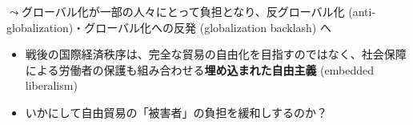 \documentclass[
  xelatex,
  ja=standard]{bxjsarticle}
\providecommand{\tightlist}{%
  \setlength{\itemsep}{0pt}\setlength{\parskip}{0pt}}\usepackage{longtable,booktabs,array}
\begin{document}
\(\leadsto\)グローバル化が一部の人々にとって負担となり、反グローバル化
(anti-globalization)・グローバル化への反発 (globalization backlash) へ

\begin{itemize}
\tightlist
\item
  戦後の国際経済秩序は、完全な貿易の自由化を目指すのではなく、社会保障による労働者の保護も組み合わせる\textbf{埋め込まれた自由主義}
  (embedded liberalism)\citep{ruggie1982}
\item
  いかにして自由貿易の「被害者」の負担を緩和しするのか？
\end{itemize}


  
\end{document}
